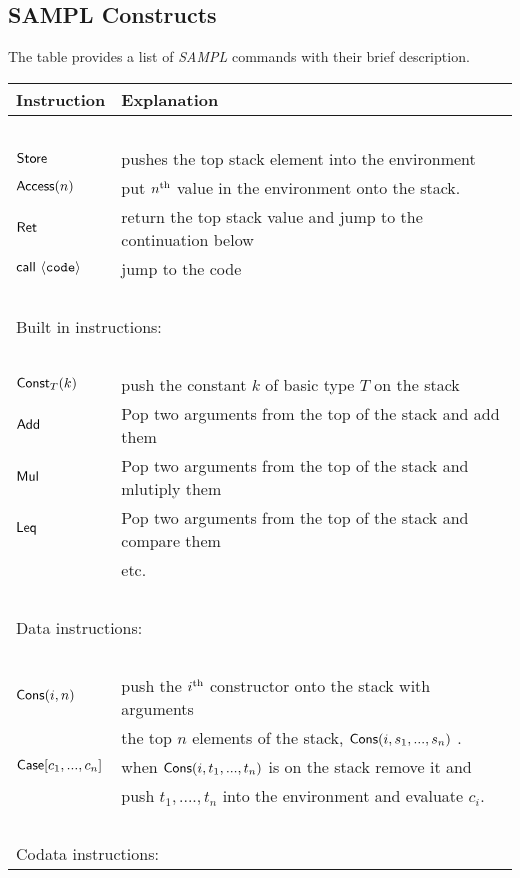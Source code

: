 \documentclass[11pt]{article}
\newcommand{\<}{\langle}
\renewcommand{\>}{\rangle}
\begin{document}
\subsection {SAMPL Constructs}
The table provides a list of {\em SAMPL} commands with their brief description.
\begin{center}
\begin{tabular}{|l|l|}
\hline
Instruction &Explanation \\ \hline
~ & ~\\
${\sf Store}$ &   pushes the top stack element into the environment \\
${\sf Access}(n)$    &   put $n^{\rm th}$ value in the environment onto the stack. \\ 
${\sf Ret} $     &       return the top stack value and jump to the continuation below \\ 
${\sf call}~\<{\tt code}\>$ & jump to the code \\
 ~ & ~ \\ \hline
\multicolumn{2}{|l|}{Built in instructions:} \\ \hline
~ & ~ \\ 
 ${\sf Const}_T(k)$       &    push the constant $k$ of basic type $T$ on the stack \\
${\sf Add}$ &             Pop two arguments from the top of the stack and add them \\ 
${\sf Mul}$ &             Pop two arguments from the top of the stack and mlutiply them \\ 
${\sf Leq}$  &            Pop two arguments from the top of the stack and compare them \\ ~ & etc. \\ 
~ & ~\\ \hline
\multicolumn{2}{|l|}{Data instructions:} \\ \hline
~ & ~ \\ 
 ${\sf Cons}(i,n)$       &    push the $i^{\rm th}$ constructor onto the stack with arguments \\
                                  & the top $n$ elements of the stack, ${\sf Cons}(i,s_1,...,s_n)$ . \\
 ${\sf Case}[c_1,...,c_n]$ &     when ${\sf Cons}(i,t_1,...,t_n)$  is on the stack remove it and \\
                                   & push $t_1, ...., t_n$ into the environment and evaluate $c_i$. \\ 
 ~ & ~ \\ \hline
 \multicolumn{2}{|l|}{Codata instructions:} \\ \hline

\end{tabular}
\end{center}
\end{document}
